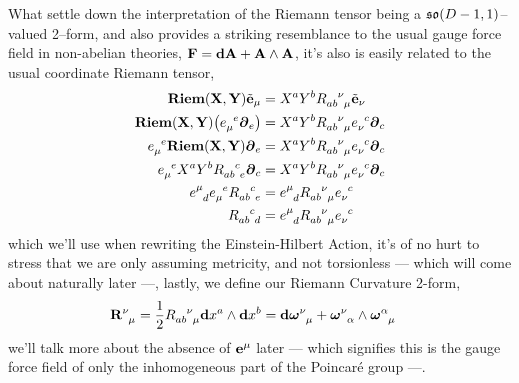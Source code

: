 What settle down the interpretation of the Riemann tensor being a $\mathfrak{so}\qty(D-1,1)$--valued 2--form, and also provides a striking resemblance to the usual gauge force field in non-abelian 
theories, $\vb F=\vb d\vb A+\vb A\wedge \vb A$, it's also is easily related to the usual coordinate Riemann tensor,
\begin{align*}
    \textbf{Riem}\qty(\vb X,\vb Y)\tilde{\vb e}_\mu&=X^aY^b\tensor{R}{_a_b^\nu_\mu}\tilde{\vb e}_\nu\\
    \textbf{Riem}\qty(\vb X,\vb Y)\qty(\tensor{e}{_\mu^e}\boldsymbol\partial_e)&=X^aY^b\tensor{R}{_a_b^\nu_\mu}\tensor{e}{_\nu^c}\boldsymbol\partial_c\\
    \tensor{e}{_\mu^e}\textbf{Riem}\qty(\vb X,\vb Y)\boldsymbol\partial_e&=X^aY^b\tensor{R}{_a_b^\nu_\mu}\tensor{e}{_\nu^c}\boldsymbol\partial_c\\
    \tensor{e}{_\mu^e}X^aY^b\tensor{R}{_a_b^c_e}\boldsymbol\partial_c&=X^aY^b\tensor{R}{_a_b^\nu_\mu}\tensor{e}{_\nu^c}\boldsymbol\partial_c\\
    \tensor{e}{^\mu_d}\tensor{e}{_\mu^e}\tensor{R}{_a_b^c_e}&=\tensor{e}{^\mu_d}\tensor{R}{_a_b^\nu_\mu}\tensor{e}{_\nu^c}\\
    \tensor{R}{_a_b^c_d}&=\tensor{e}{^\mu_d}\tensor{R}{_a_b^\nu_\mu}\tensor{e}{_\nu^c}
\end{align*}
which we'll use when rewriting the Einstein-Hilbert Action, it's of no hurt to stress that we are only assuming metricity, and not torsionless --- which will come about naturally later ---, 
lastly, we define our Riemann Curvature 2-form,
\begin{align*}
    \tensor{{\vb R}}{^\nu_\mu}&=\frac12\tensor{R}{_a_b^\nu_\mu}\vb d{x^a}\wedge\vb d{x^b}=\tensor{\vb d{\boldsymbol\omega}}{^\nu_\mu}+\tensor{{\boldsymbol\omega}}{^\nu_\alpha}\wedge\tensor{{\boldsymbol\omega}}{^\alpha_\mu}%
\end{align*}
we'll talk more about the absence of $\vb e^\mu$ later --- which signifies this is the gauge force field of only the inhomogeneous part of the Poincaré group ---.

